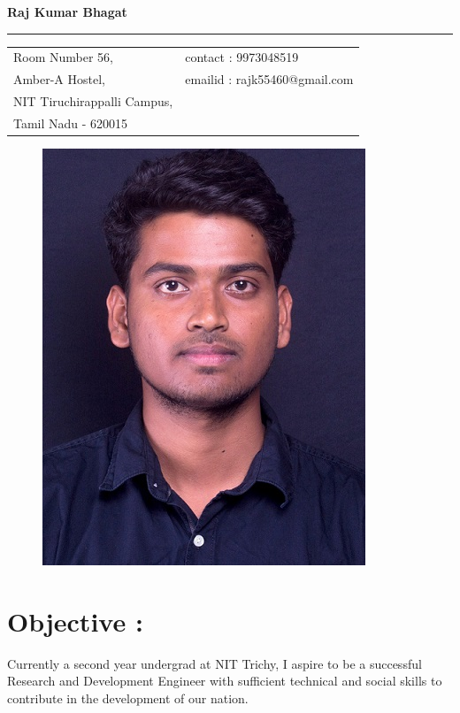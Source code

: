 \documentclass[a4paper, 12 pt]{article}
\begin{document}
 \renewcommand{\familydefault}{\sfdefault}
\centering
{\Huge\textcolor{myBlue}{\bf Raj Kumar Bhagat}}\\
\rule{18cm}{0.1pt}
\begin{table}[h]
\begin{tabular}{p{11 cm}p{6cm}}
Room Number 56,& contact : 9973048519\\
Amber-A Hostel,& emailid : rajk55460@gmail.com\\
NIT Tiruchirappalli Campus,\\
Tamil Nadu - 620015
\end{tabular}
\end{table}
\begin{figure}[H]
\raggedleft
\includegraphics[scale=0.3]{Rajk0520.jpg}
\end{figure}
\raggedright
\section*{Objective :}
Currently a second year undergrad at NIT Trichy, I aspire to be a successful Research and Development Engineer with sufficient technical and social skills to contribute in the development of our nation.
\end{document}
